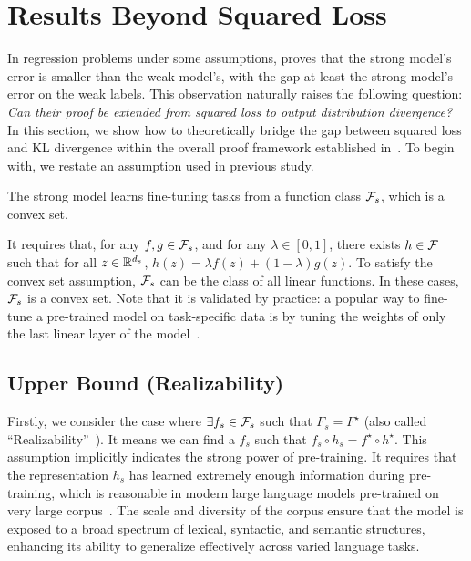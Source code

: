\section{Results Beyond Squared Loss} \label{subsec:recover_quantify}

In regression problems under some assumptions, \citet{charikar2024quantifying} proves that the strong model’s error is smaller than the weak model’s, with the gap at least the strong model’s error on the weak labels.
This observation naturally raises the following question:
\textit{Can their proof be extended from squared loss to output distribution divergence?}
In this section, we show how to theoretically bridge the gap between squared loss and KL divergence within the overall proof framework established in~\citet{charikar2024quantifying}.
To begin with, we restate an assumption used in previous study.
\begin{assumption} \label{convex_set}
The strong model learns fine-tuning tasks from a function class $\mathcal{F}_{s}$, which is a convex set. 
\end{assumption}
\vspace{-5pt}
It requires that, for any $f, g \in \mathcal{F}_s$, and for any $\lambda \in [0,1]$, there exists $h \in \mathcal{F}$ such that for all $z \in \mathbb{R}^{d_s}$, $h(z) = \lambda f(z) + (1-\lambda) g(z)$. 
To satisfy the convex set assumption, $\mathcal{F}_s$ can be the class of all linear functions.
In these cases, $\mathcal{F}_s$ is a convex set. 
Note that it is validated by practice: a popular way to fine-tune a pre-trained model on task-specific data is by tuning the weights of only the last linear layer of the model~\citep{howard2018universal,kumar2022fine}.

\subsection{Upper Bound (Realizability)} \label{subsub:realize}

Firstly, we consider the case where $\exists f_s \in \mathcal{F}_s$ such that $F_s = F^\star$ (also called ``Realizability''~\citep{charikar2024quantifying}).
It means we can find a $f_s$ such that $f_s \circ h_s = f^\star \circ h^\star$.
This assumption implicitly indicates the strong power of pre-training. 
It requires that the representation $h_s$ has learned extremely enough information during pre-training, which is reasonable in modern large language models pre-trained on very large corpus~\citep{touvron2023llama,achiam2023gpt}.
The scale and diversity of the corpus ensure that the model is exposed to a broad spectrum of lexical, syntactic, and semantic structures, enhancing its ability to generalize effectively across varied language tasks.

